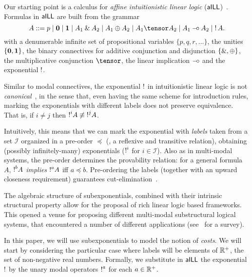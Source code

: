 
Our starting point is a calculus for \emph{affine intuitionistic linear logic} ($\textsf{aILL}$)~\cite{DBLP:journals/tcs/Girard87}. Formulas in $\textsf{aILL}$ are built from the grammar 
\[
 A ::= p \mid \zero \mid \one  
 \mid A_1 \with A_2  \mid A_1 
 \oplus A_2 \mid   A_1 \tensor A_2
  \mid A_1 \lolli A_2\mid \bang A.
\]
with a denumerable infinite set of propositional variables $\{p, q, r, \ldots\}$, the unities $\{{\bf 0},{\bf 1}\}$,  the binary connectives for additive conjunction and disjunction $\{\mathbin{\&},\oplus\}$, the multiplicative conjunction $\tensor$, the  linear implication $\mathbin{-\hspace{-0.70mm}\circ}$ and the exponential $\mathop{!}$.

Similar to modal connectives, the exponential $\mathop{!}$ in intuitionistic linear logic  is not {\em canonical}~\cite{DBLP:conf/kgc/DanosJS93}, in the sense that, even having the same scheme for introduction rules, marking the exponentials with different labels  does not preserve equivalence. That is, if  $i\not= j$ then
$\hbox{$\mathop{!}^{i}$}A\not\equiv\hbox{$\mathop{!}^{j}$}A$.

Intuitively, this means that we can mark the exponential with {\em labels} taken from a set $\mathcal{I}$ organized in a pre-order $\preceq$ (\ie, a reflexive and transitive relation), obtaining (possibly infinitely-many) exponentials ($\hbox{$\mathop{!}^{i}$}$
for $i\in\mathcal{I}$).
Also as in multi-modal systems, the pre-order  determines the provability relation: 
for a general formula $A$, $\hbox{$\mathop{!}^{b}$}A$ {\em implies} $\hbox{$\mathop{!}^{a}$}A$ iff $a \preceq b$.
%
Pre-ordering the labels (together with an upward closeness requirement)
guarantees cut-elimination~\cite{DBLP:journals/jar/NigamM10}. 

The algebraic structure of subexponentials, combined with their intrinsic structural property allow for the proposal of rich linear logic based frameworks. This opened a venue for proposing different multi-modal substructural logical systems, that encountered a number of different applications (see~\cite{DBLP:conf/fscd/PimentelON21} for a survey). 

In this paper, we will use subexponentials to model the notion of {\em costs}. We will start by considering the particular case where labels will be elements of $\mathbb{R}^+$, the set of non-negative real numbers. Formally, we substitute in $\textsf{aILL}$
the exponential $\mathop{!}$ by the unary modal operators $\hbox{$\mathop{!}^{a}$}$ 
for each $a\in\mathbb{R}^+$. 

